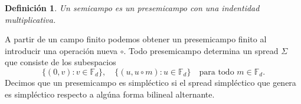 \documentclass[a4paper]{report}
\DeclareMathOperator{\C}{\mathbb{C}}
\DeclareMathOperator{\tr}{tr}
\DeclareMathOperator{\Sl}{\mathfrak{sl}}
\newtheorem{definition}{Definición}
\newtheorem{proposition}{Proposición}
\begin{document}
  \begin{definition}
    Un semicampo es un presemicampo con una indentidad
    multiplicativa.
  \end{definition}


  A partir de un campo finito podemos obtener un
  presemicampo finito al introducir una operación nueva
  $\circ$. Todo presemicampo determina un spread $\Sigma$
  que consiste de los subespacios
  \begin{equation}
    \label{eqn:presemi_spread}
    \{(0,v) : v \in \mathbb F_d\},
    \quad 
    \{(u, u \circ m) : u \in \mathbb F_d\}
    \quad
    \text{para todo } m \in \mathbb F_d.
  \end{equation}
  Decimos que un presemicampo es simpléctico si el spread
  simpléctico que genera es simpléctico respecto a algúna
  forma bilineal alternante.
\end{document}

